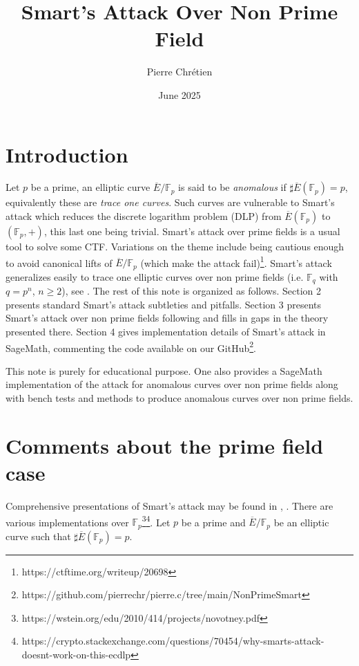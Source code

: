 \documentclass[10pt]{article}
\theoremstyle{definition}
\newcommand{\F}{\mathbb{F}}
\begin{document}

\author{Pierre Chrétien}
\title{Smart's Attack Over Non Prime Field}
\date{June 2025}
\maketitle


\section{Introduction}


Let $p$ be a prime, an elliptic curve $\overline{E}/\F_p$ is said to be \textsl{anomalous} if $\sharp \overline{E}(\F_p) = p$, equivalently these are \textsl{trace one curves}.
Such curves are vulnerable to Smart's attack  \cite{Sma99} which reduces the discrete logarithm problem (DLP) from $\overline{E}(\F_p)$ to $(\F_p , +)$, this last one being trivial.
Smart's attack over prime fields is a usual tool to solve some CTF.
Variations on the theme include being cautious enough to avoid canonical lifts of $\overline{E}/\F_p$ (which make the attack fail)\footnote{https://ctftime.org/writeup/20698}.
Smart's attack generalizes easily to trace one elliptic curves over non prime fields (i.e. $\F_q$ with $q = p^n$, $n \geq 2$), see \cite{Hofman}.
The rest of this note is organized as follows.
Section 2 presents standard Smart's attack subtleties and pitfalls.
Section 3 presents Smart's attack over non prime fields following \cite{Hofman} and fills in gaps in the theory presented there.
Section 4 gives implementation details of Smart's attack in SageMath, commenting the code available on our GitHub\footnote{https://github.com/pierrechr/pierre.c/tree/main/NonPrimeSmart}.

This note is purely for educational purpose.
One also provides a SageMath implementation of the attack for anomalous curves over non prime fields along with bench tests and methods to produce anomalous curves over non prime fields.
\section{Comments about the prime field case}

Comprehensive presentations of Smart's attack may be found in \cite{Hofman}, \cite{LEPREVOST2005225}. 
There are various implementations over $\F_p$\footnote{https://wstein.org/edu/2010/414/projects/novotney.pdf}\footnote{https://crypto.stackexchange.com/questions/70454/why-smarts-attack-doesnt-work-on-this-ecdlp}.
Let $p$ be a prime and $\overline{E}/\F_p$ be an elliptic curve such that $\sharp \overline{E}(\F_p) = p$.
\end{document}
